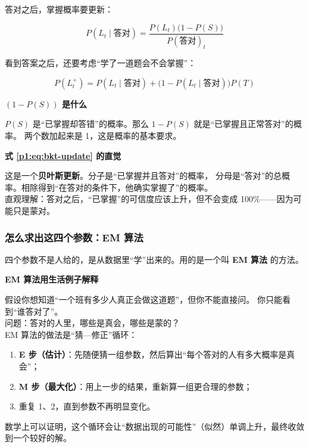 \documentclass[UTF8,a4paper,11pt]{ctexart}
\newenvironment{explainbox}[1]
{\begin{center}\begin{minipage}{0.94\textwidth}\colorbox{boxbg}{\parbox{0.92\textwidth}{\textbf{#1}\par\vspace{2pt}}}}
{\end{minipage}\end{center}}
\newcommand{\term}[1]{\textbf{#1}}
\newcommand{\hl}[1]{\textcolor{blue!70!black}{\textbf{#1}}}
\begin{document}
答对之后，掌握概率要更新：

\begin{equation}
P(L_t \mid \text{答对}) = \frac{P(L_t)\big(1-P(S)\big)}{P(\text{答对})_t}
\label{p1:eq:bkt-update}
\end{equation}

看到答案之后，还要考虑“学了一道题会不会掌握”：

\begin{equation}
P(L_t^{+}) = P(L_t \mid \text{答对}) + \Big(1 - P(L_t \mid \text{答对})\Big)P(T)
\label{p1:eq:bkt-transition}
\end{equation}

\begin{explainbox}{$(1-P(S))$ 是什么}
$P(S)$ 是“已掌握却答错”的概率。那么 $1-P(S)$ 就是“已掌握且正常答对”的概率。
两个数加起来是 1，这是概率的基本要求。
\end{explainbox}

\begin{explainbox}{式 \eqref{p1:eq:bkt-update} 的直觉}
这是一个\hl{贝叶斯更新}。分子是“已掌握并且答对”的概率，
分母是“答对”的总概率。相除得到“在答对的条件下，他确实掌握了”的概率。\\
直观理解：答对之后，“已掌握”的可信度应该上升，但不会变成 100\%——因为可能只是蒙对。
\end{explainbox}

\subsubsection{怎么求出这四个参数：EM 算法}

四个参数不是人给的，是从数据里“学”出来的。用的是一个叫 \term{EM 算法} 的方法。

\begin{explainbox}{EM 算法用生活例子解释}
假设你想知道“一个班有多少人真正会做这道题”，但你不能直接问。
你只能看到“谁答对了”。\\
问题：答对的人里，哪些是真会，哪些是蒙的？\\
EM 算法的做法是“猜—修正”循环：
\begin{enumerate}[leftmargin=1.4em,itemsep=1pt]
\item \textbf{E 步（估计）}：先随便猜一组参数，然后算出“每个答对的人有多大概率是真会”；
\item \textbf{M 步（最大化）}：用上一步的结果，重新算一组更合理的参数；
\item 重复 1、2，直到参数不再明显变化。
\end{enumerate}
数学上可以证明，这个循环会让“数据出现的可能性”（似然）单调上升，最终收敛到一个较好的解。
\end{explainbox}
\end{document}
